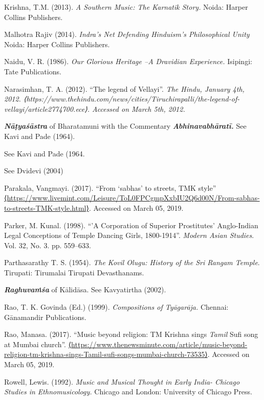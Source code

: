 \begin{thebibliography}{99}
  Krishna, T.M. (2013). \textit{A Southern Music: The Karnatik Story. }Noida: Harper Collins Publishers.

  Malhotra Rajiv (2014). \textit{Indra’s Net Defending Hinduism’s Philosophical Unity }Noida: Harper Collins Publishers.

  Naidu, V. R. (1986). \textit{Our Glorious Heritage –A Dravidian Experience. }Isipingi: Tate Publications.

  Narasimhan, T. A. (2012). ``The legend of Vellayi''. \textit{The Hindu, January 4th, 2012. ⟨https://www.thehindu.com/news/cities/Tiruchirapalli/the-legend-of-vellayi/article2774700.ece⟩. Accessed on March 5th, 2012.}

  \textbf{\textit{Nāṭyaśāstra}} of Bharatamuni with the Commentary \textbf{\textit{Abhinavabhāratī.}} See Kavi and Pade (1964).

 See Kavi and Pade (1964.

 See Dvidevi (2004)

  Parakala, Vangmayi. (2017). “From ‘sabhas’ to streets, TMK style” \url{⟨https://www.livemint.com/Leisure/ToL0FPCgmpXxbIU2Q6d00N/From-sabhas-to-streets-TMK-style.html⟩}. Accessed on March 05, 2019.

  Parker, M. Kunal. (1998). “'A Corporation of Superior Prostitutes' Anglo-Indian Legal Conceptions of Temple Dancing Girls, 1800-1914”. \textit{Modern Asian Studies}. Vol. 32, No. 3. pp. 559--633.

  Parthasarathy T. S. (1954). \textit{The Kovil Olugu: History of the Sri Rangam Temple}. Tirupati: Tirumalai Tirupati Devasthanams.

  \textit{\textbf{Raghuvaṁśa}} of Kālidāsa. See Kavyatirtha (2002).

  Rao, T. K. Govinda (Ed.) (1999). \textit{Compositions of Tyāgarāja. }Chennai: Gānamandir Publications.

  Rao, Manasa. (2017). “Music beyond religion: TM Krishna sings \textit{Tamil} Sufi song at Mumbai church”. \url{⟨https://www.thenewsminute.com/article/music-beyond-religion-tm-krishna-sings-Tamil-sufi-songs-mumbai-church-73535⟩}. Accessed on March 05, 2019.

  Rowell, Lewis. (1992). \textit{Music and Musical Thought in Early India- Chicago Studies in Ethnomusicology.} Chicago and London: University of Chicago Press.


\end{thebibliography}
